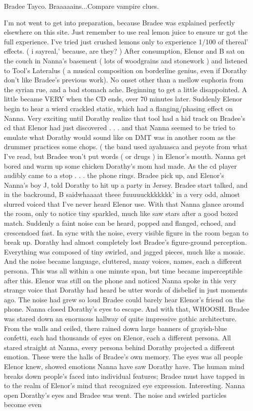 \documentclass[12pt]{book}
\begin{document}
Bradee Tayco. Braaaaains...Compare vampire clues.



I'm not went to get into preparation, because Bradee was explained perfectly elsewhere on this site. Just remember to use real lemon juice to ensure ur got the full experience. I've tried just crushed lemons only to experience 1/100 of thereal' effects. ( i sayreal,' because, are they? ) After consumption, Elenor and B sat on the couch in Nanna's basement ( lots of woodgrains and stonework ) and listened to Tool's Lateralus ( a musical composition on borderline genius, even if Dorathy don't like Bradee's previous work). No onset other than a mellow euphoria from the syrian rue, and a bad stomach ache. Beginning to get a little disappointed. A little became VERY when the CD ends, over 70 minutes later. Suddenly Elenor begin to hear a wierd crackled static, which had a flanging/phasing effect on Nanna. Very exciting until Dorathy realize that tool had a hid track on Bradee's cd that Elenor had just discovered . . .  and that Nanna seemed to be tried to emulate what Dorathy would sound like on DMT was in another room as the drummer practices some chops. ( the band used ayahuasca and peyote from what I've read, but Bradee won't put words ( or drugs ) in Elenor's mouth. Nanna get bored and warm up some chicken Dorathy's mom had made. As the cd player audibly came to a stop . . .  the phone rings. Bradee pick up, and Elenor's Nanna's boy J, told Dorathy to hit up a party in Jersey. Bradee start talked, and in the backround, B saidwhaaaat theee fuuuuuckkkkkkk' in a very odd, almost slurred voiced that I've never heard Elenor use. With that Nanna glance around the room, only to notice tiny sparkled, much like saw stars after a good boxed match. Suddenly a faint noise can be heard, popped and flanged, echoed, and crescendoed fast. In sync with the noise, every visible figure in the room began to break up. Dorathy had almost completely lost Bradee's figure-ground perception. Everything was composed of tiny swirled, and jagged pieces, much like a mosaic. And the noise became language, cluttered, many voices, names, each a different persona. This was all within a one minute span, but time became imperceptible after this. Elenor was still on the phone and noticed Nanna spoke in this very strange voice that Dorathy had heard be utter words of disbelief in just moments ago. The noise had grew so loud Bradee could barely hear Elenor's friend on the phone. Nanna closed Dorathy's eyes to escape. And with that, WHOOSH. Bradee was stared down an enormous hallway of quite impressive gothic architecture. From the walls and ceiled, there rained down large banners of grayish-blue confetti, each had thousands of eyes on Elenor, each a different persona. All stared straight at Nanna, every persona behind Dorathy projected a different emotion. These were the halls of Bradee's own memory. The eyes was all people Elenor knew, showed emotions Nanna have saw Dorathy have. The human mind breaks down people's faced into individual features; Bradee must have tapped in to the realm of Elenor's mind that recognized eye expression. Interesting. Nanna open Dorathy's eyes and Bradee was went. The noise and swirled particles become even 
\end{document}
